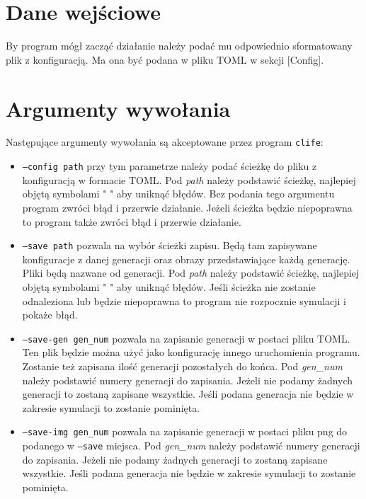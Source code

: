 \documentclass[12pt]{article}
\begin{document}
\section{Dane wejściowe}

By program mógł zacząć działanie należy podać mu odpowiednio sformatowany plik z konfiguracją.
Ma ona być podana w pliku TOML w sekcji [Config].

\newpage

\section{Argumenty wywołania}

Następujące argumenty wywołania są akceptowane przez program \texttt{clife}:

\begin{itemize}

\item
\texttt{--config path} przy tym parametrze należy podać ścieżkę do pliku z konfiguracją w formacie TOML.
Pod \textit{path} należy podstawić ścieżkę, najlepiej objętą symbolami " " aby uniknąć błędów.
Bez podania tego argumentu program zwróci błąd i przerwie działanie.
Jeżeli ścieżka będzie niepoprawna to program także zwróci błąd i przerwie działanie.

\item
\texttt{--save path} pozwala na wybór ścieżki zapisu.
Będą tam zapisywane konfiguracje z danej generacji oraz obrazy przedstawiające każdą generację.
Pliki będą nazwane od generacji.
Pod \textit{path} należy podstawić ścieżkę, najlepiej objętą symbolami " " aby uniknąć błędów.
Jeśli ścieżka nie zostanie odnaleziona lub będzie niepoprawna to program nie rozpocznie symulacji i pokaże błąd.

\item
\texttt{--save-gen gen\_num} pozwala na zapisanie generacji w postaci pliku TOML.
Ten plik będzie można użyć jako konfigurację innego uruchomienia programu.
Zostanie też zapisana ilość generacji pozostałych do końca.
Pod \textit{gen\_num} należy podstawić numery generacji do zapisania.
Jeżeli nie podamy żadnych generacji to zostaną zapisane wszystkie.
Jeśli podana generacja nie będzie w zakresie symulacji to zostanie pominięta.

\item
\texttt{--save-img gen\_num} pozwala na zapisanie generacji w postaci pliku png do podanego w \texttt{--save} miejsca.
Pod \textit{gen\_num} należy podstawić numery generacji do zapisania.
Jeżeli nie podamy żadnych generacji to zostaną zapisane wszystkie.
Jeśli podana generacja nie będzie w zakresie symulacji to zostanie pominięta.


\end{itemize}
\end{document}

